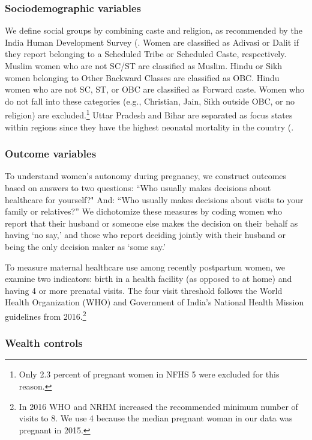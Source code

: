 \documentclass[12pt]{article}
\begin{document}
\subsubsection{Sociodemographic variables}  

We define social groups by combining caste and religion, as recommended by the India Human Development Survey (\cite{desai2008india}. Women are classified as Adivasi or Dalit if they report belonging to a Scheduled Tribe or Scheduled Caste, respectively. Muslim women who are not SC/ST are classified as Muslim. Hindu or Sikh women belonging to Other Backward Classes are classified as OBC. Hindu women who are not SC, ST, or OBC are classified as Forward caste. Women who do not fall into these categories (e.g., Christian, Jain, Sikh outside OBC, or no religion) are excluded.\footnote{Only 2.3 percent of pregnant women in NFHS 5 were excluded for this reason.} Uttar Pradesh and Bihar are separated as focus states within regions since they have the highest neonatal mortality in the country (\cite{coffey2025excess}. 

\subsubsection{Outcome variables} \label{sec:outcomes}
To understand women's autonomy during pregnancy, we construct outcomes based on answers to two questions: ``Who usually makes decisions about healthcare for yourself?"  And: ``Who usually makes decisions about visits to your family or relatives?'' We dichotomize these measures by coding women who report that their husband or someone else makes the decision on their behalf as having ‘no say,’ and those who report deciding jointly with their husband or being the only decision maker as ‘some say.’

To measure maternal healthcare use among recently postpartum women, we examine two indicators: birth in a health facility (as opposed to at home) and having 4 or more prenatal visits. The four visit threshold follows the World Health Organization (WHO) and Government of India’s National Health Mission guidelines from 2016.\footnote{In 2016 WHO and NRHM increased the recommended minimum number of visits to 8.  We use 4 because the median pregnant woman in our data was pregnant in 2015.}

\subsubsection{Wealth controls} \label{sec:wealthcontrols}
\end{document}
